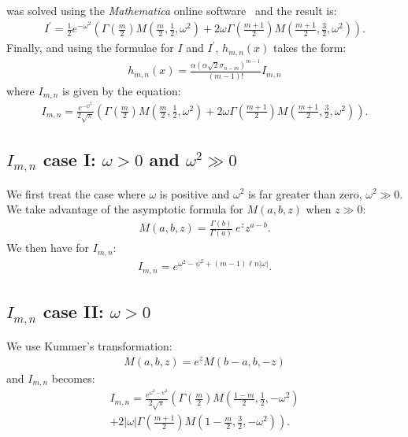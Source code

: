 \documentclass[preprint,12pt]{elsarticle}
\begin{document}
was solved using the \emph{Mathematica} online software~\cite{math} and the result is:
\begin{align}
I^\prime = \frac{1}{2} e^{-\omega^2} 
\left(  \Gamma\left( \frac{m}{2} \right) M\left( \frac{m}{2}, \frac{1}{2}, \omega^2 \right)  + 2\omega \Gamma\left( \frac{m+1}{2} \right) M\left(\frac{m+1}{2}, \frac{3}{2}, \omega^2  \right)  \right).  
\end{align}
Finally, and using the formulae for $I$ and $I^\prime$, $h_{m,n}(x)$ takes the form:
\begin{align}
h_{m,n}(x) =  \frac{ \alpha (\alpha\sqrt{2} \sigma_{n-m})^{m-1}}{(m-1)!}  I_{m,n}
\end{align} 
where $I_{m,n}$  is given by the equation:
\begin{align}
I_{m,n} = \frac{ e^{-\psi^2} }{ 2\sqrt{\pi} }\left( \Gamma\left( \frac{m}{2} \right) M\left( \frac{m}{2}, \frac{1}{2}, \omega^2 \right)  + 2\omega \Gamma\left( \frac{m+1}{2} \right) M\left(\frac{m+1}{2}, \frac{3}{2}, \omega^2 \right) \right).  
\end{align}

\subsection*{$I_{m,n}$ case I: $\omega> 0$ and $\omega^2 \gg 0$ }
%

We first treat the case where $\omega$ is positive and $\omega^2$ is far greater than zero, $\omega^2 \gg 0$.  
We take advantage of the asymptotic formula for $M(a,b,z)$ when $z \gg 0$:
\begin{align}
M(a,b,z) = \frac{\Gamma (b)}{\Gamma(a)} \  e^z z^{a-b}.
\end{align}
We then have for $I_{m,n}$:
\begin{align}
 I_{m,n} = e^{\omega^2 - \psi^2 + (m-1) \ell n |\omega|}.
\end{align}

\subsection*{$I_{m,n}$ case II: $\omega >0$}
%

We use Kummer's transformation:
\begin{align}
M(a,b,z) = e^z M(b-a,b,-z)
\end{align}
and $I_{m,n}$ becomes:
\begin{align}
I_{m,n} = \frac{ e^{\omega^2 -\psi^2 } }{2\sqrt{\pi}} \left(  \Gamma\left( \frac{m}{2} \right) M\left(\frac{1-m}{2}, \frac{1}{2}, -\omega^2 \right)  \nonumber \right. \\ \left. 
+ 2|\omega| \Gamma\left( \frac{m+1}{2} \right) M\left(1-\frac{m}{2}, \frac{3}{2}, -\omega^2 \right)     \right).
\end{align}
\end{document}
